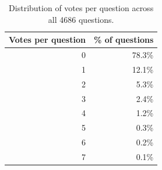 \begin{table}[ht]
  \centering
  \begin{tabular}{rr}
    \toprule
    Votes per question & \% of questions \\
    \midrule
    0 & 78.3\% \\
    1 & 12.1\% \\
    2 & 5.3\% \\
    3 & 2.4\% \\
    4 & 1.2\% \\
    5 & 0.3\% \\
    6 & 0.2\% \\
    7 & 0.1\% \\
    \bottomrule
  \end{tabular}
  \caption{Distribution of votes per question across all 4686 questions.}
  \label{tab:votes-per-question}
\end{table}
